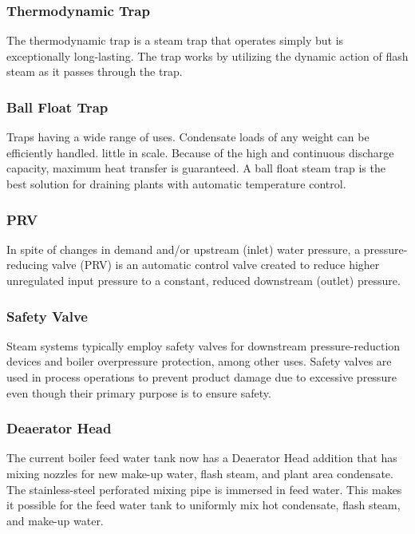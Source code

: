 \subsubsection{Thermodynamic Trap}
The thermodynamic trap is a steam trap that operates simply but is exceptionally long-lasting. The trap works by utilizing the dynamic action of flash steam as it passes through the trap.

\subsubsection{Ball Float Trap}
Traps having a wide range of uses. Condensate loads of any weight can be efficiently handled. little in scale. Because of the high and continuous discharge capacity, maximum heat transfer is guaranteed. A ball float steam trap is the best solution for draining plants with automatic temperature control.

\subsubsection{PRV}
In spite of changes in demand and/or upstream (inlet) water pressure, a pressure-reducing valve (PRV) is an automatic control valve created to reduce higher unregulated input pressure to a constant, reduced downstream (outlet) pressure.

\subsubsection{Safety Valve}
Steam systems typically employ safety valves for downstream pressure-reduction devices and boiler overpressure protection, among other uses. Safety valves are used in process operations to prevent product damage due to excessive pressure even though their primary purpose is to ensure safety.

\subsubsection{Deaerator Head}
The current boiler feed water tank now has a Deaerator Head addition that has mixing nozzles for new make-up water, flash steam, and plant area condensate. The stainless-steel perforated mixing pipe is immersed in feed water. This makes it possible for the feed water tank to uniformly mix hot condensate, flash steam, and make-up water.


